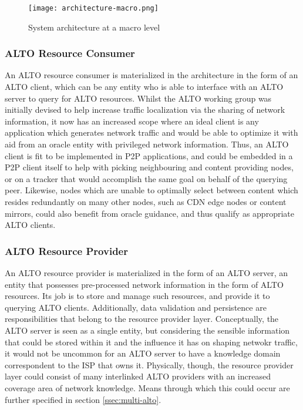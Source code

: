 \begin{figure}[!h]
        \centering
        \texttt{[image: architecture-macro.png]}
        \caption{System architecture at a macro level}
        \label{fig:macro-architecture}
\end{figure}

\subsubsection{ALTO Resource Consumer}

An ALTO resource consumer is materialized in the architecture in the form of an ALTO client, which can be any entity who is able to interface with an ALTO server to query for ALTO resources. Whilst the ALTO working group was initially devised to help increase traffic localization via the sharing of network information, it now has an increased scope where an ideal client is any application which generates network traffic and would be able to optimize it with aid from an oracle entity with privileged network information. Thus, an ALTO client is fit to be implemented in P2P applications, and could be embedded in a P2P client itself to help with picking neighbouring and content providing nodes, or on a tracker that would accomplish the same goal on behalf of the querying peer. Likewise, nodes which are unable to optimally select between content which resides redundantly on many other nodes, such as CDN edge nodes or content mirrors, could also benefit from oracle guidance, and thus qualify as appropriate ALTO clients.

\subsubsection{ALTO Resource Provider}

An ALTO resource provider is materialized in the form of an ALTO server, an entity that possesses pre-processed network information in the form of ALTO resources. Its job is to store and manage such resources, and provide it to querying ALTO clients. Additionally, data validation and persistence are responsibilities that belong to the resource provider layer. Conceptually, the ALTO server is seen as a single entity, but considering the sensible information that could be stored within it and the influence it has on shaping netwokr traffic, it would not be uncommon for an ALTO server to have a knowledge domain correspondent to the ISP that owns it. Physically, though, the resource provider layer could consist of many interlinked ALTO providers with an increased coverage area of network knowledge. Means through which this could occur are further specified in section \ref{ssec:multi-alto}.

